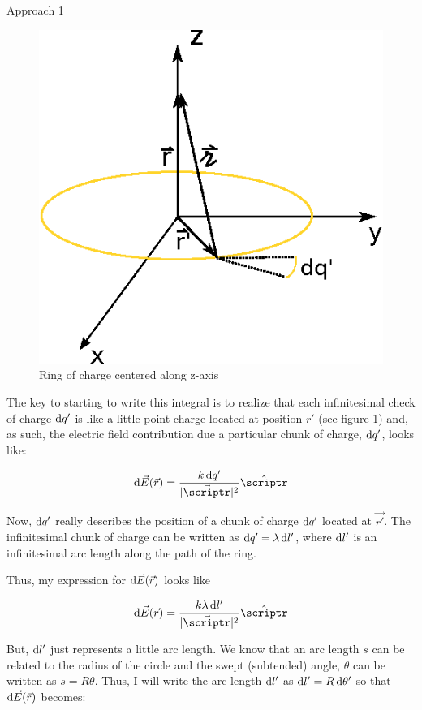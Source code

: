 \begin{homeworkProblem}
\begin{homeworkSection}{Approach 1}
        \begin{figure}[t]
            \centering    
            \includegraphics{./img/ringofcharge.eps}
            \caption{Ring of charge centered along z-axis}
            \label{fig:roc.eps}
        \end{figure}

        The key to starting to write this integral is to realize that
        each infinitesimal check of charge $\mathop{}\!\mathrm{d} q'$ is like a little point
        charge located at position $r'$ (see figure \ref{fig:roc.eps})
        and, as such, the electric field contribution due a particular
        chunk of charge, $\mathop{}\!\mathrm{d} q'$, looks like:

        \[ \diff \vec{E}(\vec{r}) = \frac{k \diff q'}{|\vec{\scriptr}|^2}
        \hat{\scriptr} \]

        Now, $\mathop{}\!\mathrm{d} q'$ really describes the position of a chunk of charge
        $\mathop{}\!\mathrm{d} q'$ located at $\vec{r'}$. The infinitesimal chunk of charge
        can be written as $\mathop{}\!\mathrm{d} q' = \lambda \mathop{}\!\mathrm{d} l'$, where $\mathop{}\!\mathrm{d}
        l'$ is an infinitesimal arc length along the path of the ring.

        Thus, my expression for $\mathop{}\!\mathrm{d} \vec{E}(\vec{r})$ looks like
        
        \[ \diff \vec{E}(\vec{r}) = \frac{k \lambda \diff l'}{|\vec{\scriptr}|^2}
        \hat{\scriptr} \]

        But, $\mathop{}\!\mathrm{d} l'$ just represents a little arc length. We know
        that an arc length $s$ can be related to the radius of the
        circle and the swept (subtended) angle, $\theta$ can be written
        as $s = R \theta$. Thus, I will write the arc length $\mathop{}\!\mathrm{d} l'$
        as $\mathop{}\!\mathrm{d} l' = R \mathop{}\!\mathrm{d} \theta'$ so that $\mathop{}\!\mathrm{d} \vec{E}(\vec{r})$
        becomes:



\end{homeworkSection}
\end{homeworkProblem}
